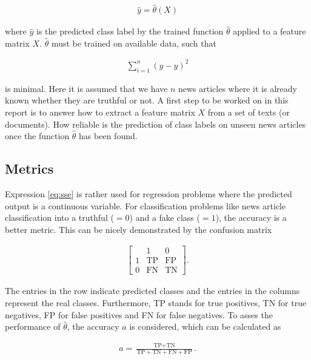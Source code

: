 \documentclass[a4paper,12pt,nottoc]{article}
\begin{document}
\begin{gather}
\hat{y} =\hat{\theta}(X)
\end{gather}

\noindent where $\hat{y}$ is the predicted class label by the trained function $\hat{\theta}$ applied to a feature matrix $X$. $\hat{\theta}$ must be trained on available data, such that

\begin{gather}\label{eq:sse}
\sum_{i=1}^{n} \left(y - \hat{y} \right)^2
\end{gather}

\noindent is minimal. Here it is assumed that we have $n$ news articles where it is already known whether they are truthful or not. A first step to be worked on in this report is to answer how to extract a feature matrix $X$ from a set of texts (or documents). How reliable is the prediction of class labels on unseen news articles once the function $\hat{\theta}$ has been found.

\subsection{Metrics}

Expression \ref{eq:sse} is rather used for regression problems where the predicted output is a continuous variable. For classification problems like news article classification into a truthful ($= 0$) and a fake class ($= 1$), the accuracy is a better metric. This can be nicely demonstrated by the confusion matrix

\begin{gather}
\begin{bmatrix}
& 1 & 0 \\
1 & \textrm{TP} & \textrm{FP} \\
0 & \textrm{FN} & \textrm{TN}
\end{bmatrix}.
\end{gather}

\noindent The entries in the row indicate predicted classes and the entries in the columns represent the real classes. Furthermore, TP stands for true positives, TN for true negatives, FP for false positives and FN for false negatives. To asses the performance of $\hat{\theta}$, the accuracy $a$ is considered, which can be calculated as

\begin{gather}
a = \frac{\textrm{TP} + \textrm{TN}}{\textrm{TP} + \textrm{TN} + \textrm{FN} + \textrm{FP}}.
\end{gather}
\end{document}
